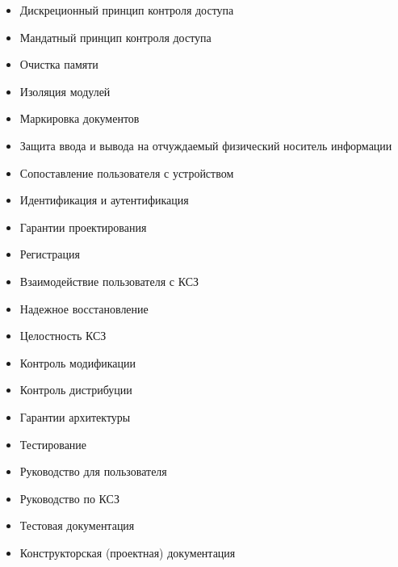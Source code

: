 \begin{multicols}{2}
\begin{itemize}
\item Дискреционный принцип контроля доступа
\item Мандатный принцип контроля доступа
\item Очистка памяти
\item Изоляция модулей
\item Маркировка документов
\item Защита ввода и вывода на отчуждаемый физический носитель информации
\item Сопоставление пользователя с устройством
\item Идентификация и аутентификация
\item Гарантии проектирования
\columnbreak
\item Регистрация
\item Взаимодействие пользователя с КСЗ
\item Надежное восстановление
\item Целостность КСЗ
\item Контроль модификации
\item Контроль дистрибуции
\item Гарантии архитектуры
\item Тестирование
\item Руководство для пользователя
\item Руководство по КСЗ
\item Тестовая документация
\item Конструкторская (проектная) документация
\end{itemize}
\end{multicols}
